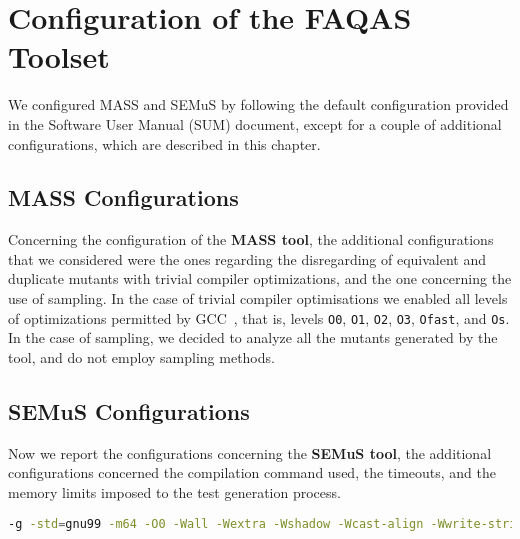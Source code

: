 
\chapter{Configuration of the FAQAS Toolset}



We configured MASS and SEMuS by following the default configuration provided in the Software User Manual (SUM) document, except for a couple of additional configurations, which are described in this chapter.

\section{MASS Configurations}


Concerning the configuration of the \textbf{MASS tool}, the additional configurations that we considered were the ones regarding the disregarding of equivalent and duplicate mutants with trivial compiler optimizations, and the one concerning the use of sampling.
In the case of trivial compiler optimisations we enabled all levels of optimizations permitted by GCC~\cite{GCCopt}, that is, levels \texttt{O0}, \texttt{O1}, \texttt{O2}, \texttt{O3}, \texttt{Ofast}, and \texttt{Os}. 
In the case of sampling, we decided to analyze all the mutants generated by the tool, and do not employ sampling methods. 

\section{SEMuS Configurations}

Now we report the configurations concerning the \textbf{SEMuS tool}, the additional configurations concerned the compilation command used, the timeouts, and the memory limits imposed to the test generation process.

\begin{lstlisting}[language=bash, label=libutil_com_cmd, caption=Compilation command for a single Libutil source used in SEMuS.]
-g -std=gnu99 -m64 -O0 -Wall -Wextra -Wshadow -Wcast-align -Wwrite-strings -Wno-unused-parameter -I$repo_root_dir/src -I$repo_root_dir/src/gosh -I$repo_root_dir/src/zip -I$repo_root_dir/src/watchdog  -I$repo_root_dir/build/src/watchdog -I$repo_root_dir/build/src -I$repo_root_dir/include -I$repo_root_dir/build/include -I$repo_root_dir/include/gs -I$repo_root_dir/build/include/gs -I$repo_root_dir/include/deprecated -I$repo_root_dir/build/include/deprecated -I$repo_root_dir/include/deprecated/gs/gosh -I$repo_root_dir/build/include/deprecated/gs/gosh -I$repo_root_dir/include -o $out_file $in_file
\end{lstlisting}

